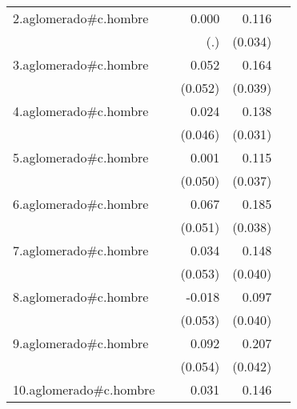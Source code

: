 {\begin{longtable}{l*{4}{D{.}{.}{-1}}}
\addlinespace
2.aglomerado#c.hombre&                     &       0.000         &       0.116\sym{***}&                     \\
            &                     &         (.)         &     (0.034)         &                     \\
\addlinespace
3.aglomerado#c.hombre&                     &       0.052         &       0.164\sym{***}&                     \\
            &                     &     (0.052)         &     (0.039)         &                     \\
\addlinespace
4.aglomerado#c.hombre&                     &       0.024         &       0.138\sym{***}&                     \\
            &                     &     (0.046)         &     (0.031)         &                     \\
\addlinespace
5.aglomerado#c.hombre&                     &       0.001         &       0.115\sym{**} &                     \\
            &                     &     (0.050)         &     (0.037)         &                     \\
\addlinespace
6.aglomerado#c.hombre&                     &       0.067         &       0.185\sym{***}&                     \\
            &                     &     (0.051)         &     (0.038)         &                     \\
\addlinespace
7.aglomerado#c.hombre&                     &       0.034         &       0.148\sym{***}&                     \\
            &                     &     (0.053)         &     (0.040)         &                     \\
\addlinespace
8.aglomerado#c.hombre&                     &      -0.018         &       0.097\sym{*}  &                     \\
            &                     &     (0.053)         &     (0.040)         &                     \\
\addlinespace
9.aglomerado#c.hombre&                     &       0.092         &       0.207\sym{***}&                     \\
            &                     &     (0.054)         &     (0.042)         &                     \\
\addlinespace
10.aglomerado#c.hombre&                     &       0.031         &       0.146\sym{***}&                     \\

\end{longtable}}
